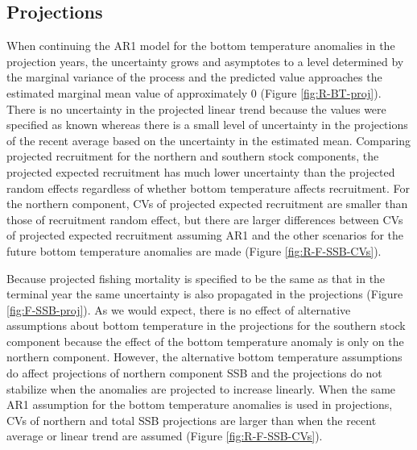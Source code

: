 \documentclass[
]{article}
\begin{document}
\hypertarget{projections-1}{%
\subsection*{Projections}\label{projections-1}}

When continuing the AR1 model for the bottom temperature anomalies in
the projection years, the uncertainty grows and asymptotes to a level
determined by the marginal variance of the process and the predicted
value approaches the estimated marginal mean value of approximately 0
(Figure \ref{fig:R-BT-proj}). There is no uncertainty in the projected
linear trend because the values were specified as known whereas there is
a small level of uncertainty in the projections of the recent average
based on the uncertainty in the estimated mean. Comparing projected
recruitment for the northern and southern stock components, the
projected expected recruitment has much lower uncertainty than the
projected random effects regardless of whether bottom temperature
affects recruitment. For the northern component, CVs of projected
expected recruitment are smaller than those of recruitment random
effect, but there are larger differences between CVs of projected
expected recruitment assuming AR1 and the other scenarios for the future
bottom temperature anomalies are made (Figure \ref{fig:R-F-SSB-CVs}).

Because projected fishing mortality is specified to be the same as that
in the terminal year the same uncertainty is also propagated in the
projections (Figure \ref{fig:F-SSB-proj}). As we would expect, there is
no effect of alternative assumptions about bottom temperature in the
projections for the southern stock component because the effect of the
bottom temperature anomaly is only on the northern component. However,
the alternative bottom temperature assumptions do affect projections of
northern component SSB and the projections do not stabilize when the
anomalies are projected to increase linearly. When the same AR1
assumption for the bottom temperature anomalies is used in projections,
CVs of northern and total SSB projections are larger than when the
recent average or linear trend are assumed (Figure
\ref{fig:R-F-SSB-CVs}).
\end{document}
